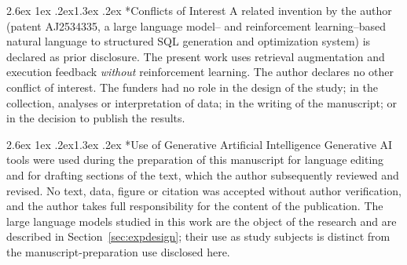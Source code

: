 \documentclass[10pt]{article}
\makeatletter
\renewcommand\section{\@startsection{section}{1}{\z@}%
  {2.6ex \@plus 1ex \@minus .2ex}{1.3ex \@plus .2ex}%
  {\normalfont\large\bfseries}}
\makeatother
\begin{document}
\section*{Conflicts of Interest}
A related invention by the author (patent AJ2534335, a large language model--
and reinforcement learning--based natural language to structured SQL generation
and optimization system) is declared as prior disclosure. The present work uses
retrieval augmentation and execution feedback \emph{without} reinforcement
learning. The author declares no other conflict of interest. The funders had no
role in the design of the study; in the collection, analyses or interpretation
of data; in the writing of the manuscript; or in the decision to publish the
results.

\section*{Use of Generative Artificial Intelligence}
Generative AI tools were used during the preparation of this manuscript for
language editing and for drafting sections of the text, which the author
subsequently reviewed and revised. No text, data, figure or citation was
accepted without author verification, and the author takes full responsibility
for the content of the publication. The large language models studied in this
work are the object of the research and are described in
Section~\ref{sec:expdesign}; their use as study subjects is distinct from the
manuscript-preparation use disclosed here.
\end{document}
